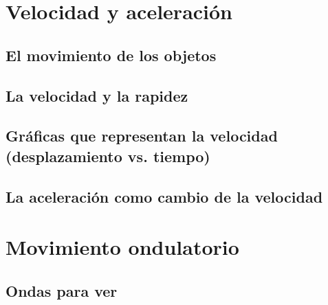 \documentclass[11pt]{book}
\newcommand{\choice}{\item}
\begin{document}



\section{Velocidad y aceleraci\'on}
\subsection{El movimiento de los objetos}
\subsection{La velocidad y la rapidez}
\subsection{Gr\'aficas que representan la velocidad (desplazamiento vs. tiempo)}
\subsection{La aceleraci\'on como cambio de la velocidad}

\section{Movimiento ondulatorio}
\subsection{Ondas para ver}
\end{document}
